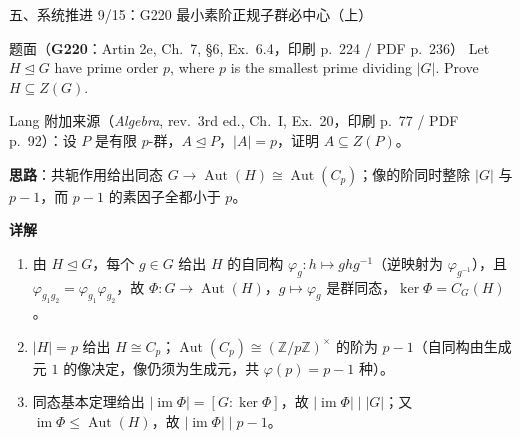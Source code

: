 \documentclass[aspectratio=169,10pt,fontset=none]{ctexbeamer}
\newcommand{\ex}[1]{\textcolor{accent}{\footnotesize\bfseries #1}}
\newcommand{\key}[1]{\textcolor{ink}{\bfseries #1}}
\begin{document}
\begin{frame}[t]{五、系统推进 9/15：G220 最小素阶正规子群必中心（上）}
\label{ex:G220}\leavevmode
\scriptsize
\begin{block}{\footnotesize 题面（\ex{G220}：Artin 2e, Ch.~7, \S6, Ex.~6.4，印刷 p.~224 / PDF p.~236）}
Let $H\trianglelefteq G$ have prime order $p$, where $p$ is the smallest prime dividing $|G|$. Prove $H\subseteq Z(G)$.

Lang 附加来源（\textit{Algebra}, rev.\ 3rd ed., Ch.~I, Ex.~20，印刷 p.~77 / PDF p.~92）：设 $P$ 是有限 $p$-群，$A\trianglelefteq P$，$|A|=p$，证明 $A\subseteq Z(P)$。
\end{block}
\key{思路}：共轭作用给出同态 $G\to\operatorname{Aut}(H)\cong\operatorname{Aut}(C_p)$；像的阶同时整除 $|G|$ 与 $p-1$，而 $p-1$ 的素因子全都小于 $p$。

\key{详解}
\begin{enumerate}
  \item 由 $H\trianglelefteq G$，每个 $g\in G$ 给出 $H$ 的自同构 $\varphi_g:h\mapsto ghg^{-1}$（逆映射为 $\varphi_{g^{-1}}$），且 $\varphi_{g_1g_2}=\varphi_{g_1}\varphi_{g_2}$，故 $\Phi:G\to\operatorname{Aut}(H)$，$g\mapsto\varphi_g$ 是群同态，$\ker\Phi=C_G(H)$。
  \item $|H|=p$ 给出 $H\cong C_p$；$\operatorname{Aut}(C_p)\cong(\mathbb Z/p\mathbb Z)^{\times}$ 的阶为 $p-1$（自同构由生成元 $1$ 的像决定，像仍须为生成元，共 $\varphi(p)=p-1$ 种）。
  \item 同态基本定理给出 $|\operatorname{im}\Phi|=[G:\ker\Phi]$，故 $|\operatorname{im}\Phi|\mid|G|$；又 $\operatorname{im}\Phi\le\operatorname{Aut}(H)$，故 $|\operatorname{im}\Phi|\mid p-1$。
\end{enumerate}
\end{frame}
\end{document}
